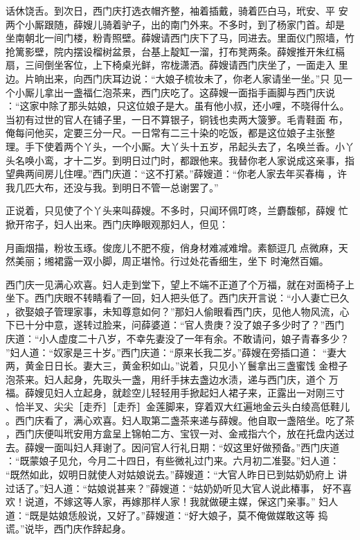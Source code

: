 话休饶舌。到次日，西门庆打选衣帽齐整，袖着插戴，骑着匹白马，玳安、平
安两个小厮跟随，薛嫂儿骑着驴子，出的南门外来。不多时，到了杨家门首。却是
坐南朝北一间门楼，粉青照壁。薛嫂请西门庆下了马，同进去。里面仪门照墙，竹
抢篱影壁，院内摆设榴树盆景，台基上靛缸一溜，打布凳两条。薛嫂推开朱红槅
扇，三间倒坐客位，上下椅桌光鲜，帘栊潇洒。薛嫂请西门庆坐了，一面走入
里边。片晌出来，向西门庆耳边说：“大娘子梳妆未了，你老人家请坐一坐。”只
见一个小厮儿拿出一盏福仁泡茶来，西门庆吃了。这薛嫂一面指手画脚与西门庆说
：“这家中除了那头姑娘，只这位娘子是大。虽有他小叔，还小哩，不晓得什么。
当初有过世的官人在铺子里，一日不算银子，铜钱也卖两大箥箩。毛青鞋面
布，俺每问他买，定要三分一尺。一日常有二三十染的吃饭，都是这位娘子主张整
理。手下使着两个丫头，一个小厮。大丫头十五岁，吊起头去了，名唤兰香。小丫
头名唤小鸾，才十二岁。到明日过门时，都跟他来。我替你老人家说成这亲事，指
望典两间房儿住哩。”西门庆道：“这不打紧。”薛嫂道：“你老人家去年买春梅
，许我几匹大布，还没与我。到明日不管一总谢罢了。”

正说着，只见使了个丫头来叫薛嫂。不多时，只闻环佩叮咚，兰麝馥郁，薛嫂
忙掀开帘子，妇人出来。西门庆睁眼观那妇人，但见：

月画烟描，粉妆玉琢。俊庞儿不肥不瘦，俏身材难减难增。素额逗几
点微麻，天然美丽；缃裙露一双小脚，周正堪怜。行过处花香细生，坐下
时淹然百媚。

西门庆一见满心欢喜。妇人走到堂下，望上不端不正道了个万福，就在对面椅子上
坐下。西门庆眼不转睛看了一回，妇人把头低了。西门庆开言说：“小人妻亡已久
，欲娶娘子管理家事，未知尊意如何？”那妇人偷眼看西门庆，见他人物风流，心
下已十分中意，遂转过脸来，问薛婆道：“官人贵庚？没了娘子多少时了？”西门
庆道：“小人虚度二十八岁，不幸先妻没了一年有余。不敢请问，娘子青春多少？
”妇人道：“奴家是三十岁。”西门庆道：“原来长我二岁。”薛嫂在旁插口道：
“妻大两，黄金日日长。妻大三，黄金积如山。”说着，只见小丫鬟拿出三盏蜜饯
金橙子泡茶来。妇人起身，先取头一盏，用纤手抹去盏边水渍，递与西门庆，道个
万福。薛嫂见妇人立起身，就趁空儿轻轻用手掀起妇人裙子来，正露出一对刚三寸
、恰半叉、尖尖［走乔］［走乔］金莲脚来，穿着双大红遍地金云头白绫高低鞋儿
。西门庆看了，满心欢喜。妇人取第二盏茶来递与薛嫂。他自取一盏陪坐。吃了茶
，西门庆便叫玳安用方盒呈上锦帕二方、宝钗一对、金戒指六个，放在托盘内送过
去。薛嫂一面叫妇人拜谢了。因问官人行礼日期：“奴这里好做预备。”西门庆道
：“既蒙娘子见允，今月二十四日，有些微礼过门来。六月初二准娶。”妇人道：
“既然如此，奴明日就使人对姑娘说去。”薛嫂道：“大官人昨日已到姑奶奶府上
讲过话了。”妇人道：“姑娘说甚来？”薛嫂道：“姑奶奶听见大官人说此椿事，
好不喜欢！说道，不嫁这等人家，再嫁那样人家！我就做硬主媒，保这门亲事。”
妇人道：“既是姑娘恁般说，又好了。”薛嫂道：“好大娘子，莫不俺做媒敢这等
捣谎。”说毕，西门庆作辞起身。

